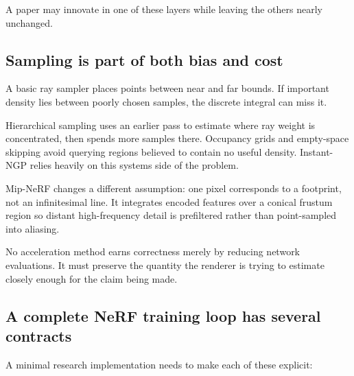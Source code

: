 A paper may innovate in one of these layers while leaving the others nearly unchanged.

\subsection{Sampling is part of both bias and cost}\label{04-visual-computing-ii-ch035-sampling-is-part-of-both-bias-and-cost}

A basic ray sampler places points between near and far bounds. If important density lies between poorly chosen samples, the discrete integral can miss it.

Hierarchical sampling uses an earlier pass to estimate where ray weight is concentrated, then spends more samples there. Occupancy grids and empty-space skipping avoid querying regions believed to contain no useful density. Instant-NGP relies heavily on this systems side of the problem.

Mip-NeRF changes a different assumption: one pixel corresponds to a footprint, not an infinitesimal line. It integrates encoded features over a conical frustum region so distant high-frequency detail is prefiltered rather than point-sampled into aliasing.

No acceleration method earns correctness merely by reducing network evaluations. It must preserve the quantity the renderer is trying to estimate closely enough for the claim being made.

\subsection{A complete NeRF training loop has several contracts}\label{04-visual-computing-ii-ch035-a-complete-nerf-training-loop-has-several-contracts}

A minimal research implementation needs to make each of these explicit:

